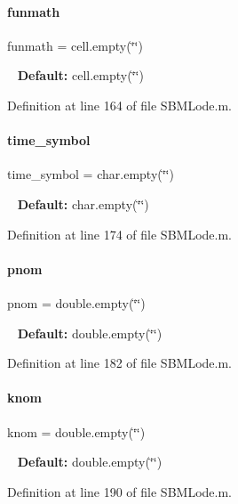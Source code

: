 \mbox{\label{class_s_b_m_lode_a9c1cb6154a226c993c60010300a62e34}} 
\paragraph{\texorpdfstring{funmath}{funmath}}
{\footnotesize\ttfamily funmath = cell.\+empty(\char`\"{}\char`\"{})}

~\newline
{\bfseries Default\+:} cell.\+empty(\char`\"{}\char`\"{}) 

Definition at line 164 of file S\+B\+M\+Lode.\+m.

\mbox{\label{class_s_b_m_lode_ac38903669f208bc49c971c7a69f62225}} 
\paragraph{\texorpdfstring{time\+\_\+symbol}{time\_symbol}}
{\footnotesize\ttfamily time\+\_\+symbol = char.\+empty(\char`\"{}\char`\"{})}

~\newline
{\bfseries Default\+:} char.\+empty(\char`\"{}\char`\"{}) 

Definition at line 174 of file S\+B\+M\+Lode.\+m.

\mbox{\label{class_s_b_m_lode_aab64bc684d10326610cc4e866d7ed65c}} 
\paragraph{\texorpdfstring{pnom}{pnom}}
{\footnotesize\ttfamily pnom = double.\+empty(\char`\"{}\char`\"{})}

~\newline
{\bfseries Default\+:} double.\+empty(\char`\"{}\char`\"{}) 

Definition at line 182 of file S\+B\+M\+Lode.\+m.

\mbox{\label{class_s_b_m_lode_a744d356a79732f2b65d02f220c580dd4}} 
\paragraph{\texorpdfstring{knom}{knom}}
{\footnotesize\ttfamily knom = double.\+empty(\char`\"{}\char`\"{})}

~\newline
{\bfseries Default\+:} double.\+empty(\char`\"{}\char`\"{}) 

Definition at line 190 of file S\+B\+M\+Lode.\+m.

